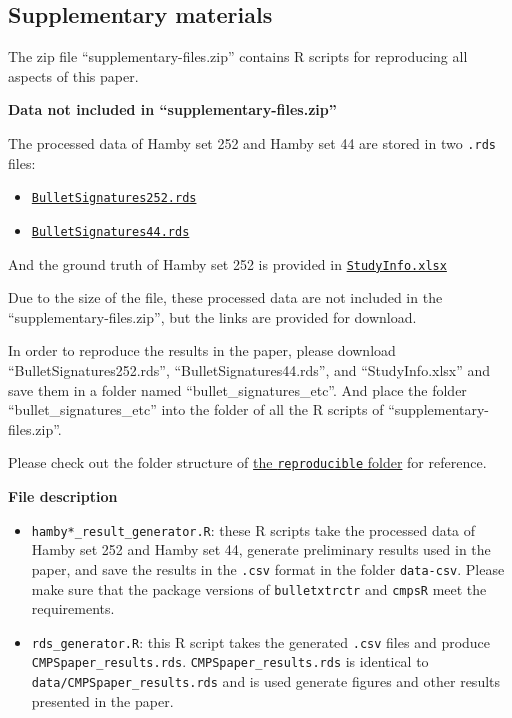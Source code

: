 \hypertarget{supplementary-materials}{%
\subsection{Supplementary materials}\label{supplementary-materials}}

The zip file ``supplementary-files.zip'' contains R scripts for reproducing all aspects of this paper.

\textbf{Data not included in ``supplementary-files.zip''}

The processed data of Hamby set 252 and Hamby set 44 are stored in two \texttt{.rds} files:

\begin{itemize}
\tightlist
\item
  \href{https://github.com/willju-wangqian/CMPSpaper/blob/main/reproducible/bullet_signatures_etc/BulletSignatures252.rds}{\texttt{BulletSignatures252.rds}}
\item
  \href{https://github.com/willju-wangqian/CMPSpaper/blob/main/reproducible/bullet_signatures_etc/BulletSignatures44.rds}{\texttt{BulletSignatures44.rds}}
\end{itemize}

And the ground truth of Hamby set 252 is provided in \href{https://github.com/willju-wangqian/CMPSpaper/blob/main/reproducible/bullet_signatures_etc/StudyInfo.xlsx}{\texttt{StudyInfo.xlsx}}

Due to the size of the file, these processed data are not included in the ``supplementary-files.zip'', but the links are provided for download.

In order to reproduce the results in the paper, please download ``BulletSignatures252.rds'', ``BulletSignatures44.rds'', and ``StudyInfo.xlsx'' and save them in a folder named ``bullet\_signatures\_etc''. And place the folder ``bullet\_signatures\_etc'' into the folder of all the R scripts of ``supplementary-files.zip''.

Please check out the folder structure of \href{https://github.com/willju-wangqian/CMPSpaper/tree/main/reproducible}{the \texttt{reproducible} folder} for reference.

\textbf{File description}

\begin{itemize}
\tightlist
\item
  \texttt{hamby*\_result\_generator.R}: these R scripts take the processed data of Hamby set 252 and Hamby set 44, generate preliminary results used in the paper, and save the results in the \texttt{.csv} format in the folder \texttt{data-csv}. Please make sure that the package versions of \texttt{bulletxtrctr} and \texttt{cmpsR} meet the requirements.
\item
  \texttt{rds\_generator.R}: this R script takes the generated \texttt{.csv} files and produce \texttt{CMPSpaper\_results.rds}. \texttt{CMPSpaper\_results.rds} is identical to \texttt{data/CMPSpaper\_results.rds} and is used generate figures and other results presented in the paper.
\end{itemize}

